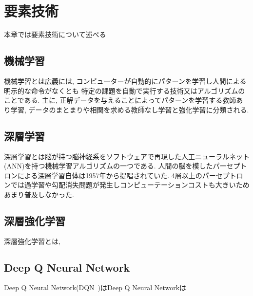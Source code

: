 \chapter{要素技術}
\label{technical_background}

本章では要素技術について述べる


\section{機械学習}

機械学習とは広義には, コンピューターが自動的にパターンを学習し人間による明示的な命令がなくとも
特定の課題を自動で実行する技術又はアルゴリズムのことである. 主に, 正解データを与えることによってパターンを学習する教師あり学習, データのまとまりや相関を求める教師なし学習と強化学習に分類される.


\section{深層学習}

深層学習とは脳が持つ脳神経系をソフトウェアで再現した人工ニューラルネット(ANN)を持つ機械学習アルゴリズムの一つである. 
人間の脳を模したパーセプトロンによる深層学習自体は1957年から提唱されていた. 4層以上のパーセプトロンでは過学習や勾配消失問題が発生しコンピューテーションコストも大きいためあまり普及しなかった.

\section{深層強化学習}

深層強化学習とは, 

\section{Deep Q Neural Network}

Deep Q Neural Network(DQN~\cite{DQN})はDeep Q Neural Networkは


